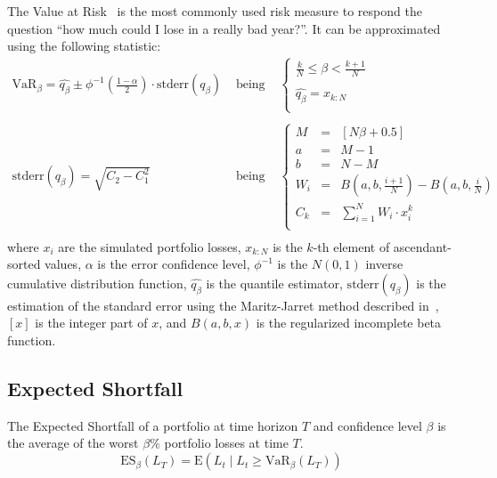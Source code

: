 \documentclass[11pt,fleqn]{book} %
\begin{document}
The Value at Risk~\cite{var:jorion} is the most commonly 
used risk measure to respond the question \enquote{how much could I lose in a 
really bad year?}. It can be approximated using the following statistic:
\begin{displaymath}
	\begin{array}{lcl}
		\textrm{VaR}_{\beta} = \widehat{q_{\beta}} \pm \phi^{-1}\left(\frac{1-\alpha}{2}\right) \cdot \textrm{stderr}(q_{\beta})
		& \text{ being } &
		\left\{
		\begin{array}{l}
			\displaystyle
			\frac{k}{N} \leq \beta < \frac{k+1}{N} \\
			\\
			\displaystyle
			\widehat{q_{\beta}} = x_{k:N} \\
		\end{array}
		\right.
		\\
		& &
		\\
		\textrm{stderr}(q_{\beta}) = \sqrt{C_2 - C_1^2}
		& \text{ being } &
		\left\{
		\begin{array}{rcl}
			M   & = & [N \beta + 0.5]  \\
			a   & = & M - 1            \\
			b   & = & N - M            \\
			W_i & = & B(a,b,\frac{i+1}{N}) - B(a,b,\frac{i}{N}) \\
			C_k & = & \sum_{i=1}^{N} W_i \cdot x_i^k \\
		\end{array}
		\right.
		\\
	\end{array}
\end{displaymath}
where $x_i$ are the simulated portfolio losses, $x_{k:N}$ is the $k$-th 
element of ascendant-sorted values, $\alpha$ is the error confidence level, 
$\phi^{-1}$ is the $N(0,1)$ inverse cumulative distribution function, 
$\widehat{q_{\beta}}$ is the quantile estimator, $\textrm{stderr}(q_{\beta})$ 
is the estimation of the standard error using the Maritz-Jarret method 
described in~\cite{quant:algor}, $[x]$ is the integer part of $x$, and 
$B(a,b,x)$ is the regularized incomplete beta function.

\subsection{Expected Shortfall}

\begin{definition}
	The Expected Shortfall of a portfolio at time horizon $T$ and 
	confidence level $\beta$ is the average of the worst $\beta\%$ portfolio 
	losses at time $T$.
	\begin{displaymath}
		\text{ES}_\beta(L_T) = \text{E}(L_t \mid L_t \ge \text{VaR}_\beta(L_T))
	\end{displaymath}
\end{definition}
\end{document}
